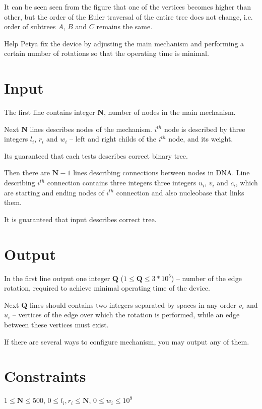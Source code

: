 \documentclass [11pt, a4paper, oneside, notitlepage] {article}
\begin{document}
It can be seen seen from the figure that one of the vertices becomes higher than other, but the order of the Euler traversal of the entire tree does not change, i.e. order of subtrees $A$, $B$ and $C$ remains the same.

Help Petya fix the device by adjusting the main mechanism and performing a certain number of rotations so that the operating time is minimal.


\section*{Input}

The first line contains integer $\mathbf{N}$, number of nodes in the main mechanism.

Next $\mathbf{N}$ lines describes nodes of the mechanism. $i^{th}$ node is described by three integers $l_i$, $r_i$ and $w_i$ -- left and right childs of the $i^{th}$ node, and its weight.

Its guaranteed that each tests describes correct binary tree.

Then there are $\mathbf{N} - 1$ lines describing connections between nodes in DNA. 
Line describing $i^{th}$ connection contains three integers three integers $u_i$, $v_i$ and $c_i$, which are starting and ending nodes of $i^{th}$ connection and also nucleobase that links them.

It is guaranteed that input describes correct tree.


\section*{Output}

In the first line output one integer $\mathbf{Q}$ ($1 \le \mathbf{Q} \le 3 * 10^5$) -- number of the edge rotation, required to achieve minimal operating time of the device.

Next $\mathbf{Q}$ lines should contains two integers separated by spaces in any order $v_i$ and $u_i$ -- vertices of the edge over which the rotation is performed, while an edge between these vertices must exist.

If there are several ways to configure mechanism, you may output any of them.


\section*{Constraints}
$1 \le \mathbf{N} \le 500$,
$0 \le l_i, r_i \le \mathbf{N}$,
$0 \le w_i \le 10^9$
\end{document}
